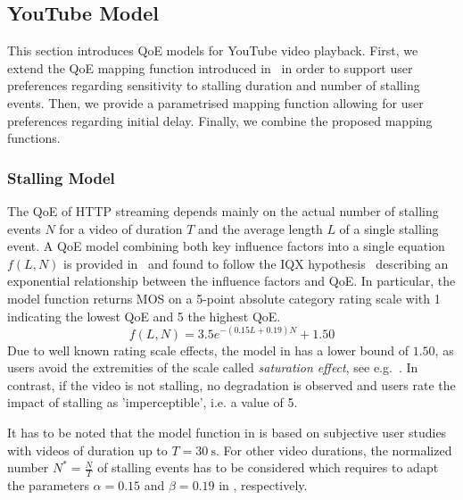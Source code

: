 \subsection{YouTube  Model}\label{sec:application:qoe_user_behaviour:typical_user_scenarios:youtube_qoe}
This section introduces \gls{QoE} models for YouTube video playback.
First, we extend the \gls{QoE} mapping function introduced in~\cite{Hossfeld2013c} in order to support user preferences regarding sensitivity to stalling duration and number of stalling events.
Then, we provide a parametrised mapping function allowing for user preferences regarding initial delay.
Finally, we combine the proposed mapping functions.

\subsubsection*{Stalling  Model}\label{sec:application:qoe_user_behaviour:typical_user_scenarios:youtube_qoe:stalling}
The \gls{QoE} of \gls{HTTP} streaming depends mainly on the actual number of stalling events \(N\) for a video of duration \(T\) and the average length \(L\) of a single stalling event.
A \gls{QoE} model combining both key influence factors into a single equation \(f(L,N)\) is provided in~\cite{Hossfeld2013c} and found to follow the IQX hypothesis~\cite{Fiedler2010} describing an exponential relationship between the influence factors and \gls{QoE}.
In particular, the model function returns \gls{MOS} on a 5-point absolute category rating scale with 1 indicating the lowest \gls{QoE} and 5 the highest \gls{QoE}. 
\begin{equation}
 f(L,N) = 3.5 e^{-(0.15L + 0.19)N}+1.50
\label{eq:application:qoe_user_behaviour:typical_user_scenarios:youtube_qoe:stalling:original_model}
\end{equation}
Due to well known rating scale effects, the model in  has a lower bound of \(1.50\), as users avoid the extremities of the scale called \emph{saturation effect}, see e.g.~\cite{Moller2000}.
In contrast, if the video is not stalling, no degradation is observed and users rate the impact of stalling as 'imperceptible', i.e. a value of 5.

It has to be noted that the model function in  is based on subjective user studies with videos of duration up to \(T=\SI{30}{\second}\).
For other video durations, the normalized number \(N^*=\frac{N}{T}\) of stalling events has to be considered which requires to adapt the parameters \(\alpha=0.15\) and \(\beta=0.19\) in , respectively. 

